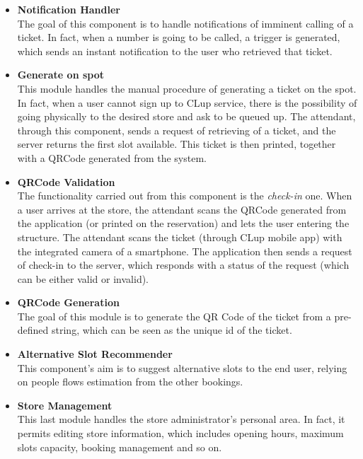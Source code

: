 \documentclass[table, 12pt]{article}
\begin{document}
\begin{itemize}
    \item \textbf{Notification Handler}\\The goal of this component is to handle notifications of imminent calling of a ticket. In fact, when a number is going to be called, a trigger is generated, which sends an instant notification to the user who retrieved that ticket.
    \item \textbf{Generate on spot}\\This module handles the manual procedure of generating a ticket on the spot. In fact, when a user cannot sign up to CLup service, there is the possibility of going physically to the desired store and ask to be queued up. The attendant, through this component, sends a request of retrieving of a ticket, and the server returns the first slot available. This ticket is then printed, together with a QRCode generated from the system.
    \item \textbf{QRCode Validation}\\The functionality carried out from this component is the \textit{check-in} one. When a user arrives at the store, the attendant scans the QRCode generated from the application (or printed on the reservation) and lets the user entering the structure. The attendant scans the ticket (through CLup mobile app) with the integrated camera of a smartphone. The application then sends a request of check-in to the server, which responds with a status of the request (which can be either valid or invalid).
    \item \textbf{QRCode Generation}\\The goal of this module is to generate the QR Code of the ticket from a pre-defined string, which can be seen as the unique id of the ticket.
    \item \textbf{Alternative Slot Recommender}\\This component's aim is to suggest alternative slots to the end user, relying on people flows estimation from the other bookings.
    \item \textbf{Store Management}\\This last module handles the store administrator's personal area. In fact, it permits editing store information, which includes opening hours, maximum slots capacity, booking management and so on.
\end{itemize}
\end{document}
